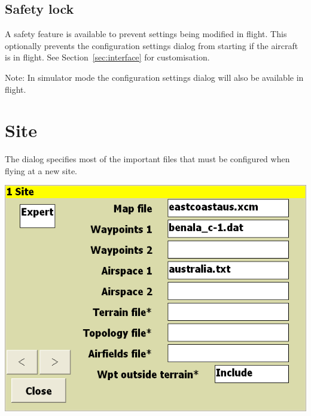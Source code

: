 \documentclass[a4paper,12pt]{refrep}
\begin{document}
\subsection*{Safety lock}

A safety feature is available to prevent settings being modified in
flight.  This optionally prevents the configuration settings dialog
from starting if the aircraft is in flight. See Section~\ref{sec:interface} for customisation.

Note: In simulator mode the configuration settings dialog will also be available in flight.



\clearpage
\section{Site}
The dialog specifies most of the important files that must be
configured when flying at a new site.

\begin{center}
\includegraphics[angle=0,width=\linewidth,keepaspectratio='true']{figures/config-0.png}
\end{center}
\end{document}
